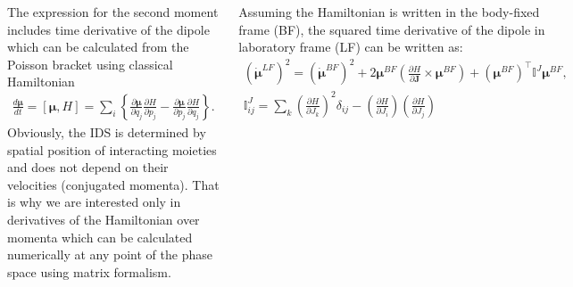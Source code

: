 \documentclass[
  20pt,
  a0paper,
  portrait,
  margin=0mm,
  innermargin=15mm,
  blockverticalspace=0mm,
  colspace=0mm,
  subcolspace=0mm
]{tikzposter}
\newcommand{\mf}{\mathbf}
\newcommand{\lb}{\left(}
\newcommand{\rb}{\right)}
\newcommand{\bbI}{\mathbb{I}}
\begin{document}
\begin{columns}
{{The expression for the second moment includes time derivative of the dipole which can be calculated from the Poisson bracket using classical Hamiltonian
\begin{gather}
		\frac{d \boldsymbol{\mu}}{dt} = \left[ \boldsymbol{\mu}, H \right] = \sum_i \left\{ \frac{\partial \boldsymbol{\mu}}{\partial q_j} \frac{\partial H}{\partial p_j} 
		- \frac{\partial \boldsymbol{\mu}}{\partial p_j} \frac{\partial H}{\partial q_j} \right\}. \label{eq:poisson} 
\end{gather}
Obviously, the IDS is determined by spatial position of interacting moieties and does not depend on their velocities (conjugated momenta). That is why we are interested only in derivatives of the Hamiltonian over momenta which can be calculated numerically at any point of the phase space using matrix formalism. \par 
Assuming the Hamiltonian is written in the body-fixed frame (BF), the squared time derivative of the dipole in laboratory frame (LF) can be written as:
\begin{gather}
		\lb \boldsymbol{\dot{\mu}}^{LF} \rb^2 =  \lb \boldsymbol{\dot{\mu}}^{BF} \rb^2 + 2 \boldsymbol{\mu}^{BF} \left( \frac{\partial H}{\partial \mf{J}} \times \boldsymbol{\mu}^{BF} \right) + \lb \boldsymbol{\mu}^{BF} \rb^\top \bbI^J \boldsymbol{\mu}^{BF}, \label{eq:dipole2}\\
		\bbI^J_{ij} = \sum_{k} \lb \frac{\partial H}{\partial J_k} \rb^2 \delta_{ij} - \lb \frac{\partial H}{\partial J_i} \rb \lb  \frac{\partial H}{\partial J_j} \rb \label{eq:I_matrix}
\end{gather}

}}
\end{columns}
\end{document}
